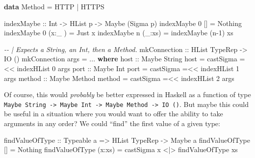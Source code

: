 \documentclass[]{article}
\newenvironment{Shaded}{}{}
\newcommand{\CommentTok}[1]{\textcolor[rgb]{0.38,0.63,0.69}{\textit{#1}}}
\newcommand{\DataTypeTok}[1]{\textcolor[rgb]{0.56,0.13,0.00}{#1}}
\newcommand{\DecValTok}[1]{\textcolor[rgb]{0.25,0.63,0.44}{#1}}
\newcommand{\KeywordTok}[1]{\textcolor[rgb]{0.00,0.44,0.13}{\textbf{#1}}}
\newcommand{\NormalTok}[1]{#1}
\newcommand{\OperatorTok}[1]{\textcolor[rgb]{0.40,0.40,0.40}{#1}}
\newcommand{\OtherTok}[1]{\textcolor[rgb]{0.00,0.44,0.13}{#1}}
\begin{document}
\begin{Shaded}
\begin{Highlighting}[]
\KeywordTok{data} \DataTypeTok{Method} \OtherTok{=} \DataTypeTok{HTTP} \OperatorTok{|} \DataTypeTok{HTTPS}

\OtherTok{indexMaybe ::} \DataTypeTok{Int} \OtherTok{{-}\textgreater{}} \DataTypeTok{HList}\NormalTok{ p }\OtherTok{{-}\textgreater{}} \DataTypeTok{Maybe}\NormalTok{ (}\DataTypeTok{Sigma}\NormalTok{ p)}
\NormalTok{indexMaybe }\DecValTok{0}\NormalTok{ []     }\OtherTok{=} \DataTypeTok{Nothing}
\NormalTok{indexMaybe }\DecValTok{0}\NormalTok{ (x}\OperatorTok{:}\NormalTok{\_ ) }\OtherTok{=} \DataTypeTok{Just}\NormalTok{ x}
\NormalTok{indexMaybe n (\_}\OperatorTok{:}\NormalTok{xs) }\OtherTok{=}\NormalTok{ indexMaybe (n}\OperatorTok{{-}}\DecValTok{1}\NormalTok{) xs}

\CommentTok{{-}{-} | Expects a String, an Int, then a Method.}
\OtherTok{mkConnection ::} \DataTypeTok{HList} \DataTypeTok{TypeRep} \OtherTok{{-}\textgreater{}} \DataTypeTok{IO}\NormalTok{ ()}
\NormalTok{mkConnection args }\OtherTok{=} \OperatorTok{...}
  \KeywordTok{where}
\OtherTok{    host ::} \DataTypeTok{Maybe} \DataTypeTok{String}
\NormalTok{    host }\OtherTok{=}\NormalTok{ castSigma }\OperatorTok{=\textless{}\textless{}}\NormalTok{ indexHList }\DecValTok{0}\NormalTok{ args}
\OtherTok{    port ::} \DataTypeTok{Maybe} \DataTypeTok{Int}
\NormalTok{    port }\OtherTok{=}\NormalTok{ castSigma }\OperatorTok{=\textless{}\textless{}}\NormalTok{ indexHList }\DecValTok{1}\NormalTok{ args}
\OtherTok{    method ::} \DataTypeTok{Maybe} \DataTypeTok{Method}
\NormalTok{    method }\OtherTok{=}\NormalTok{ castSigma }\OperatorTok{=\textless{}\textless{}}\NormalTok{ indexHList }\DecValTok{2}\NormalTok{ args}
\end{Highlighting}
\end{Shaded}

Of course, this would \emph{probably} be better expressed in Haskell as a
function of type
\texttt{Maybe\ String\ -\textgreater{}\ Maybe\ Int\ -\textgreater{}\ Maybe\ Method\ -\textgreater{}\ IO\ ()}.
But maybe this could be useful in a situation where you would want to offer the
ability to take arguments in any order? We could ``find'' the first value of a
given type:

\begin{Shaded}
\begin{Highlighting}[]
\OtherTok{findValueOfType ::} \DataTypeTok{Typeable}\NormalTok{ a }\OtherTok{=\textgreater{}} \DataTypeTok{HList} \DataTypeTok{TypeRep} \OtherTok{{-}\textgreater{}} \DataTypeTok{Maybe}\NormalTok{ a}
\NormalTok{findValueOfType []     }\OtherTok{=} \DataTypeTok{Nothing}
\NormalTok{findValueOfType (x}\OperatorTok{:}\NormalTok{xs) }\OtherTok{=}\NormalTok{ castSigma x }\OperatorTok{\textless{}|\textgreater{}}\NormalTok{ findValueOfType xs}
\end{Highlighting}
\end{Shaded}
\end{document}
